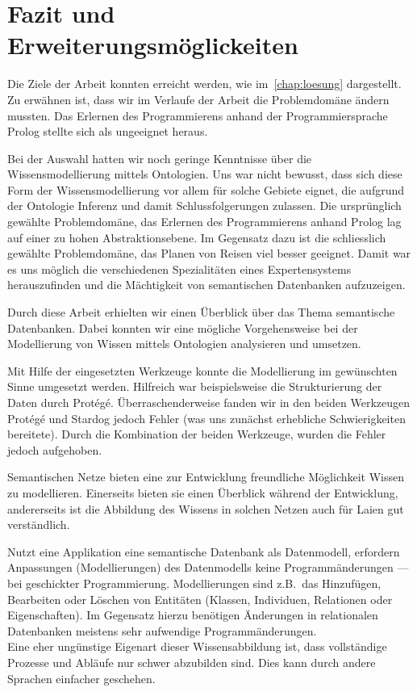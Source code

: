 \chapter{Fazit und Erweiterungsmöglickeiten}
\label{chap:fazit}


Die Ziele der Arbeit konnten erreicht werden, wie im~\autoref{chap:loesung} dargestellt. Zu erwähnen ist, dass wir im Verlaufe der Arbeit die Problemdomäne ändern mussten. Das Erlernen des Programmierens anhand der Programmiersprache Prolog stellte sich als ungeeignet heraus.

Bei der Auswahl hatten wir noch geringe Kenntnisse über die Wissensmodellierung mittels Ontologien. Uns war nicht bewusst, dass sich diese Form der Wissensmodellierung vor allem für solche Gebiete eignet, die aufgrund der Ontologie Inferenz und damit Schlussfolgerungen zulassen. Die ursprünglich gewählte Problemdomäne, das Erlernen des Programmierens anhand Prolog lag auf einer zu hohen Abstraktionsebene. Im Gegensatz dazu ist die schliesslich gewählte Problemdomäne, das Planen von Reisen viel besser geeignet. Damit war es uns möglich die verschiedenen Spezialitäten eines Expertensystems herauszufinden und die Mächtigkeit von semantischen Datenbanken aufzuzeigen.

Durch diese Arbeit erhielten wir einen Überblick über das Thema semantische Datenbanken. Dabei konnten wir eine mögliche Vorgehensweise bei der Modellierung von Wissen mittels Ontologien analysieren und umsetzen.

Mit Hilfe der eingesetzten Werkzeuge konnte die Modellierung im gewünschten Sinne umgesetzt werden. Hilfreich war beispielsweise die Strukturierung der Daten durch Protégé.
Überraschenderweise fanden wir in den beiden Werkzeugen Protégé und Stardog jedoch Fehler (was uns zunächst erhebliche Schwierigkeiten bereitete). Durch die Kombination der beiden Werkzeuge, wurden die Fehler jedoch aufgehoben.

Semantischen Netze bieten eine zur Entwicklung freundliche Möglichkeit Wissen zu modellieren. Einerseits bieten sie einen Überblick während der Entwicklung, andererseits ist die Abbildung des Wissens in solchen Netzen auch für Laien gut verständlich.

Nutzt eine Applikation eine semantische Datenbank als Datenmodell, erfordern Anpassungen (Modellierungen) des Datenmodells keine Programmänderungen --- bei geschickter Programmierung. Modellierungen sind z.B.\ das Hinzufügen, Bearbeiten oder Löschen von Entitäten (Klassen, Individuen, Relationen oder Eigenschaften). Im Gegensatz hierzu benötigen Änderungen in relationalen Datenbanken meistens sehr aufwendige Programmänderungen.\\
Eine eher ungünstige Eigenart dieser Wissensabbildung ist, dass vollständige Prozesse und Abläufe nur schwer abzubilden sind. Dies kann durch andere Sprachen einfacher geschehen.

